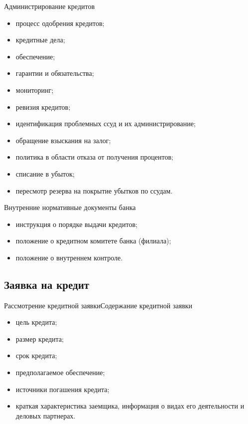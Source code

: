 \documentclass[_Banking_p2.tex]{subfiles}
\begin{document}
\begin{frame}[ allowframebreaks ]{Администрирование кредитов}
\begin{itemize}
	\item процесс одобрения кредитов;
	\item кредитные дела;
	\item обеспечение;
	\item гарантии и обязательства;
	\item мониторинг;
	\item ревизия кредитов;
	
	\pagebreak
	\item идентификация проблемных ссуд и их администрирование;
	\item обращение взыскания на залог;
	\item политика в области отказа от получения процентов;
	\item списание в убыток;
	\item пересмотр резерва на покрытие убытков по ссудам.
\end{itemize}
\end{frame}

\begin{frame}{Внутренние нормативные документы банка}
\begin{itemize}
	\item инструкция о порядке выдачи кредитов;
	\item положение о кредитном комитете банка (филиала);
	\item положение о внутреннем контроле.
\end{itemize}
\end{frame}
\subsection{Заявка на кредит}
\begin{frame}{Рассмотрение кредитной заявки}{Содержание кредитной заявки}
\begin{itemize}
	\item цель кредита;
	\item размер кредита;
	\item срок кредита;
	\item предполагаемое обеспечение;
	\item источники погашения кредита;
	\item краткая характеристика заемщика, информация о видах его деятельности и деловых партнерах.
\end{itemize}
\end{frame}
\end{document}
